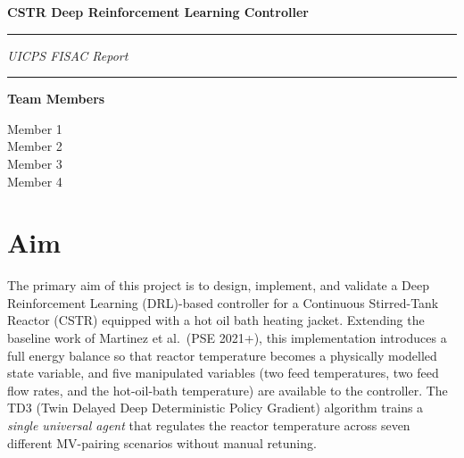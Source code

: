 \documentclass[12pt,a4paper]{article}
\begin{document}

\thispagestyle{empty}
\vspace*{3cm}

\begin{center}
  {\LARGE\bfseries CSTR Deep Reinforcement Learning Controller}

  \vspace{0.6cm}
  \noindent\rule{\textwidth}{0.8pt}
  \vspace{0.2cm}

  {\large\itshape UICPS FISAC Report}

  \vspace{0.2cm}
  \noindent\rule{\textwidth}{0.8pt}
\end{center}

\vspace{4cm}

\begin{center}
  {\large\bfseries Team Members}

  \vspace{0.5cm}
  Member 1 \\[4pt]
  Member 2 \\[4pt]
  Member 3 \\[4pt]
  Member 4
\end{center}

\newpage
\tableofcontents
\newpage

\section{Aim}

The primary aim of this project is to design, implement, and validate a Deep
Reinforcement Learning (DRL)-based controller for a Continuous Stirred-Tank
Reactor (CSTR) equipped with a hot oil bath heating jacket. Extending the
baseline work of Martinez et al.\ (PSE 2021+), this implementation introduces
a full energy balance so that reactor temperature becomes a physically modelled
state variable, and five manipulated variables (two feed temperatures, two feed
flow rates, and the hot-oil-bath temperature) are available to the controller.
The TD3 (Twin Delayed Deep Deterministic Policy Gradient) algorithm trains a
\emph{single universal agent} that regulates the reactor temperature across
seven different MV-pairing scenarios without manual retuning.
\end{document}
